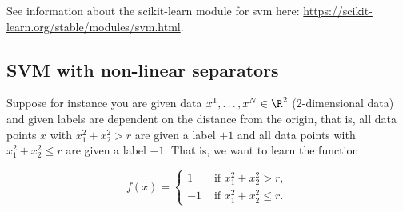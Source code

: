 See information about the scikit-learn module for svm here:
\url{https://scikit-learn.org/stable/modules/svm.html}.

\subsection{SVM with non-linear separators}

Suppose for instance you are given data $x^1, \dots, x^N \in \R^2$ (2-dimensional data) and given labels are dependent on the distance from the origin, that is,  all data points $x$ with  $x_1^2 + x_2^2 > r$ are given a label $+1$ and all data points with $x_1^2 + x_2^2 \leq r$ are given a label $-1$.   That is, we want to learn the function 

\begin{equation}
f(x) = \begin{cases}
1 & \text{ if } x_1^2 + x_2^2 >  r,\\
-1 & \text{ if } x_1^2 + x_2^2 \leq r.
\end{cases}
\end{equation}


